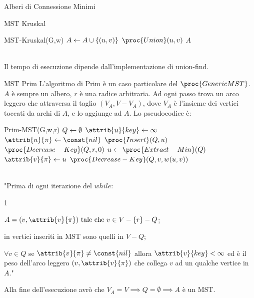 \documentclass[8pt]{extarticle}
\begin{document}
\begin{formulario}
\begin{myParagraphEnd}{Alberi di Connessione Minimi}
\begin{subParagraph}{MST Kruskal}
\begin{code}{MST-Kruskal(G,w)}
	\li {}
		\li $A\leftarrow A\cup\{(u,v)\}$
		\li $\proc{Union}(u,v)$
	\END
\END
\li \RETURN $A$
			\end{code}
\\
Il tempo di esecuzione dipende dall'implementazione di union-find.
		\end{subParagraph}
		\begin{subParagraph}{MST Prim}
L'algoritmo di Prim è un caso particolare del $\proc{GenericMST}$. $A$ è sempre un albero, $r$ è una radice arbitraria. Ad ogni passo trova un arco leggero che attraversa il taglio $(V_A, V-V_A)$, dove $V_A$ è l'insieme dei vertici toccati da archi di $A$, e lo aggiunge ad $A$. Lo pseudocodice è:
			\begin{code}{Prim-MST(G,w,r)}
\li $Q\leftarrow\emptyset$ 
\li {}
	\li $\attrib{u}{key}\get \infty$
	\li $\attrib{u}{\pi}\get\const{nil}$
	\li $\proc{Insert}(Q,u)$
\END
\li $\proc{Decrease-Key}(Q,r,0)$ 
\li {}
	\li $u\get\proc{Extract-Min}(Q)$
	\li {}
		\li {}
			\li $\attrib{v}{\pi}\get u$
			\li $\proc{Decrease-Key}(Q,v,w(u,v))$
		\END
	\END
\END
			\end{code}
\\
"Prima di ogni iterazione del $while$:
\begin{descr} {1}
	\item[1)] $A={(v,\attrib{v}{\pi}) \text{ tale che } v\in V-\{r\}-Q}$;
	\item[2)] in vertici inseriti in MST sono quelli in $V-Q$;
	\item[3)] $\forall v\in Q$ se $\attrib{v}{\pi}\neq \const{nil}$ allora $\attrib{v}{key}<\infty$ ed è il peso dell'arco leggero $(v,\attrib{v}{\pi})$ che collega $v$ ad un qualche vertice in $A$."
\end{descr}
Alla fine dell'esecuzione avrò che $V_A=V\implies Q=\emptyset \implies A$ è un MST.
		\end{subParagraph}
	
	
	
	
	
	
	
	
	
	
	
	
	\end{myParagraphEnd}
\end{formulario}
\end{document}
